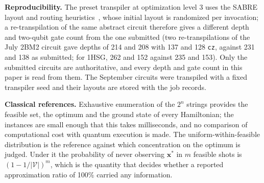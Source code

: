 \documentclass{iopjournal}
\begin{document}
\textbf{Reproducibility.} The preset transpiler at optimization level 3 uses the SABRE layout and routing heuristics~\cite{li2019sabre}, whose initial layout is randomized per invocation; a re-transpilation of the same abstract circuit therefore gives a different depth and two-qubit gate count from the one submitted (two re-transpilations of the July 2BM2 circuit gave depths of 214 and 208 with 137 and 128 \texttt{cz}, against 231 and 138 as submitted; for 1HSG, 262 and 152 against 235 and 153). Only the submitted circuits are authoritative, and every depth and gate count in this paper is read from them. The September circuits were transpiled with a fixed transpiler seed and their layouts are stored with the job records.

\textbf{Classical references.} Exhaustive enumeration of the $2^{n}$ strings provides the feasible set, the optimum and the ground state of every Hamiltonian; the instances are small enough that this takes milliseconds, and no comparison of computational cost with quantum execution is made. The uniform-within-feasible distribution is the reference against which concentration on the optimum is judged. Under it the probability of never observing $\mathbf{x}^{\ast}$ in $m$ feasible shots is $(1 - 1/|\mathcal{V}|)^{m}$, which is the quantity that decides whether a reported approximation ratio of 100\% carried any information.
\end{document}
